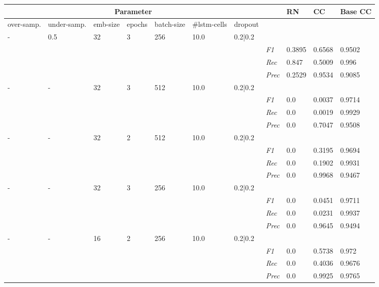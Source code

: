 \begin{table}[]
\tiny
\tabcolsep=0.11cm
\begin{tabularx}{\textwidth}{XXXXXXX|X|X|X|X}
\toprule
\multicolumn{7}{c}{Parameter} & & RN & CC & Base CC \\ \midrule
over-\newline samp. & under-\newline samp. & emb-\newline size & epochs &batch-\newline size & \#lstm-\newline cells & dropout & & & & \\ \midrule
- & 0.5 & 32 & 3 & 256 &10.0 & 0.2|0.2 & & & & \\
& & & & & & & \textit{F1} & 0.3895 & 0.6568 & 0.9502       \\
& & & & & & & \textit{Rec} &  0.847 & 0.5009  & 0.996  \\
& & & & & & & \textit{Prec} & 0.2529 & 0.9534 & 0.9085 \\ \midrule
- & - & 32 & 3 & 512 &10.0 & 0.2|0.2 & & & & \\
& & & & & & & \textit{F1} & 0.0 & 0.0037 & 0.9714       \\
& & & & & & & \textit{Rec} &  0.0 & 0.0019  & 0.9929  \\
& & & & & & & \textit{Prec} & 0.0 & 0.7047 & 0.9508 \\ \midrule
- & - & 32 & 2 & 512 &10.0 & 0.2|0.2 & & & & \\
& & & & & & & \textit{F1} & 0.0 & 0.3195 & 0.9694       \\
& & & & & & & \textit{Rec} &  0.0 & 0.1902  & 0.9931  \\
& & & & & & & \textit{Prec} & 0.0 & 0.9968 & 0.9467 \\ \midrule
- & - & 32 & 3 & 256 &10.0 & 0.2|0.2 & & & & \\
& & & & & & & \textit{F1} & 0.0 & 0.0451 & 0.9711       \\
& & & & & & & \textit{Rec} &  0.0 & 0.0231  & 0.9937  \\
& & & & & & & \textit{Prec} & 0.0 & 0.9645 & 0.9494 \\ \midrule
- & - & 16 & 2 & 256 &10.0 & 0.2|0.2 & & & & \\
& & & & & & & \textit{F1} & 0.0 & 0.5738 & 0.972       \\
& & & & & & & \textit{Rec} &  0.0 & 0.4036  & 0.9676  \\
& & & & & & & \textit{Prec} & 0.0 & 0.9925 & 0.9765 \\ \midrule

\end{tabularx}
\end{table}

